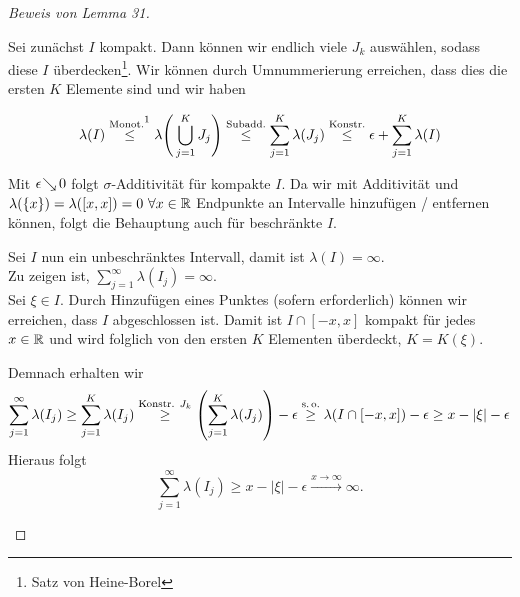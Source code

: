 \documentclass[skript.tex]{subfiles}
\begin{document}
\begin{proof}[Beweis von Lemma 31]
\begin{enumerate}[(a)]
					Sei zunächst $I$ kompakt. Dann können wir endlich viele $J_k$ auswählen,
					sodass diese $I$ überdecken\footnote{Satz von Heine-Borel}.
					Wir können durch Umnummerierung erreichen, dass dies die ersten $K$ Elemente 
					sind und wir haben
					\addtocounter{footnote}{-2}
					\[	
						\lambda(I) \overset{\text{Monot.}\footnotemark}{\leq}
						\lambda{\Bigg(\bigcup_{j=1}^K J_j\Bigg)} \overset{\text{Subadd.}}{\leq}
						\sum_{j=1}^K \lambda(J_j)  \overset{\text{Konstr.}}{\leq}
						\epsilon + \sum_{j=1}^K \lambda(I)
					\]
					\addtocounter{footnote}{1}
					Mit $\epsilon \kern -2pt \searrow \kern -1pt 0$ folgt $\sigma$-Additivität für kompakte $I$.
					Da wir mit Additivität und \\ $\lambda(\{x\}) = \lambda([x,x]) = 0 \ 
					\forall x \in \mbb{R}$ Endpunkte an Intervalle hinzufügen / entfernen können,
					folgt die Behauptung auch für beschränkte $I$.
					
					Sei $I$ nun ein unbeschränktes Intervall, damit ist $\lambda(I) = \infty$. \\
					Zu zeigen ist, $\sum_{j=1}^\infty \lambda(I_j) = \infty$. \\
					Sei $\xi \in I$. Durch Hinzufügen eines Punktes (sofern erforderlich) können wir
					erreichen, dass $I$ abgeschlossen ist. Damit ist $I \cap [-x,x]$ kompakt für jedes
					$x \in \mathbb{R}$ und wird folglich von den ersten $K$ Elementen überdeckt,
					$K = K(\xi)$.
					
					Demnach erhalten wir
					\[
						\sum_{j=1}^\infty \lambda(I_j) \geq \sum_{j=1}^K \lambda(I_j)
						 \overset{\text{Konstr. } J_k}{\geq} \left(\sum_{j=1}^K \lambda(J_j)\right)
						 -\epsilon \overset{\text{s.\,o.}}{\geq} \lambda(I \cap [-x,x]) -\epsilon
						 \geq x - \lvert\xi\rvert - \epsilon
					\]
					Hieraus folgt
					\[
						\sum_{j=1}^\infty \lambda(I_j) \geq x - \lvert\xi\rvert - \epsilon
						\xrightarrow{x \to \infty} \infty.
					\]
			\end{enumerate}
		\end{proof}
			
\end{document}
